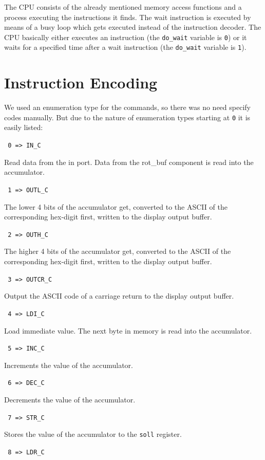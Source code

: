 \documentclass[a4paper,10pt]{scrartcl}
\begin{document}
The CPU consists of the already mentioned memory access functions and
a process executing the instructions it finds. The wait instruction is
executed by means of a busy loop which gets executed instead of the
instruction decoder. The CPU basically either executes an instruction
(the \texttt{do\_wait} variable is \texttt{0}) or it waits for a
specified time after a wait instruction (the \texttt{do\_wait} variable
is \texttt{1}).

\section{Instruction Encoding}
\label{sec:bef_cod}

We used an enumeration type for the commands, so there was no need
specify codes manually. But due to the nature of enumeration types
starting at \texttt{0} it is easily listed:

\noindent\texttt{ 0  =>  IN\_C}

Read data from the in port. Data from the rot\_buf component is read into the accumulator.

\noindent\texttt{ 1  =>  OUTL\_C}

The lower 4 bits of the accumulator get, converted to the ASCII of the
corresponding hex-digit first, written to the display output buffer.

\noindent\texttt{ 2  =>  OUTH\_C}

The higher 4 bits of the accumulator get, converted to the ASCII of the
corresponding hex-digit first, written to the display output buffer.

\noindent\texttt{ 3  =>  OUTCR\_C}

Output the ASCII code of a carriage return to the display output buffer.

\noindent\texttt{ 4  =>  LDI\_C}

Load immediate value. The next byte in memory is read into the accumulator.

\noindent\texttt{ 5  =>  INC\_C}

Increments the value of the accumulator.

\noindent\texttt{ 6  =>  DEC\_C}

Decrements the value of the accumulator.

\noindent\texttt{ 7  =>  STR\_C}

Stores the value of the accumulator to the \texttt{soll} register.

\noindent\texttt{ 8  =>  LDR\_C}
\end{document}
